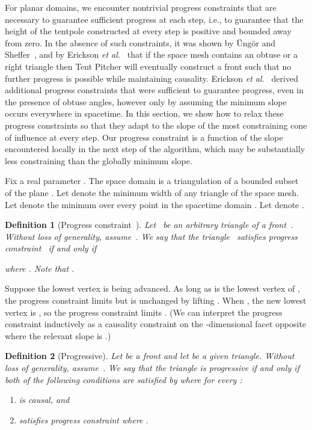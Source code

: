\documentclass[twocolumn]{article}
\def\etal{\textsl{et al.}}
\def\Ungor{\"Ung\"or}
\newtheorem{definition}{Definition}
\begin{document}
For planar domains, we encounter nontrivial progress constraints that
are necessary to guarantee sufficient progress at each step, i.e., to
guarantee that the height of the tentpole constructed at every step is
positive and bounded away from zero.  In the absence of such
constraints, it was shown by \Ungor{} and
Sheffer~\cite{ungor00tentpitcher}, and by Erickson
\etal{}~\cite{erickson02building} that if the space mesh contains an
obtuse or a right triangle then Tent Pitcher will eventually construct
a front such that no further progress is possible while maintaining
causality.  Erickson \etal{}~\cite{erickson02building} derived
additional progress constraints that were sufficient to guarantee
progress, even in the presence of obtuse angles, however only by
assuming the minimum slope occurs everywhere in spacetime.  In this
section, we show how to relax these progress constraints so that they
adapt to the slope of the most constraining cone of influence at every
step.  Our progress constraint is a function of the slope encountered
locally in the next step of the algorithm, which may be substantially
less constraining than the globally minimum slope.

Fix a real parameter .  The space domain
 is a triangulation of a bounded subset of the plane .
Let  denote the minimum width of any triangle of the space
mesh.  Let  denote the minimum  over every point 
in the spacetime domain .  Let  denote
.

\begin{definition}[Progress constraint~]
  Let~ be an arbitrary triangle of a front~. Without
  loss of generality, assume~.  We say that
  the triangle~ satisfies \emph{progress constraint~}
  if and only if
  
  where .
  Note that .
\end{definition}

Suppose the lowest vertex  is being advanced.  As long as  is
the lowest vertex of , the progress constraint limits
 but  is
unchanged by lifting .  When , the new lowest vertex
is , so the progress constraint limits .
(We can interpret the progress constraint inductively as a
causality constraint on the -dimensional facet  opposite 
where the relevant slope is .)

\begin{definition}[Progressive]
  Let  be a front and let  be a given
  triangle.  Without loss of generality, assume~.  We say that the triangle
   is \emph{progressive} if and only if
  both of the following conditions are satisfied by
   where 
  for every :
  \begin{enumerate}
  \item  is causal, and
  \item  satisfies progress constraint
     where .
  \end{enumerate}
\end{definition}
\end{document}
